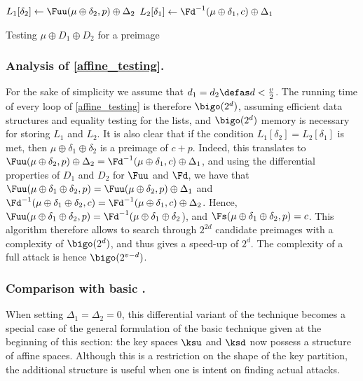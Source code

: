 \begin{algorithm}[ht]
\LinesNumbered
{}

{
	$L_1[\delta_2] \leftarrow \Fuu(\mu \oplus \delta_2, p) \oplus \Delta_2$
}
{
	$L_2[\delta_1] \leftarrow \Fd^{-1}(\mu \oplus \delta_1, c) \oplus \Delta_1$
}
{
{
}
}
\Return{$\bot$}
\caption{\label{affine_testing}Testing $\mu \oplus D_1 \oplus D_2$ for a preimage~\cite{DBLP:conf/crypto/KnellwolfK12}}

\end{algorithm}

\subsubsection{Analysis of \autoref{affine_testing}.}
For the sake of simplicity we assume that $d_1 = d_2 \defas d < \frac{v}{2}$.
The running time of every loop of \autoref{affine_testing} is therefore $\bigo(2^d)$, assuming efficient
data structures and equality testing for the lists,
and $\bigo(2^d)$ memory is necessary for storing $L_1$ and $L_2$. It is also
clear that if the condition $L_1[\delta_2] = L_2[\delta_1]$ is met, then $\mu \oplus \delta_1 \oplus \delta_2$
is a preimage of $c + p$. Indeed, this translates to $\Fuu(\mu \oplus \delta_2, p) \oplus \Delta_2
= \Fd^{-1}(\mu \oplus \delta_1, c) \oplus \Delta_1$, and using the differential properties
of $D_1$ and $D_2$ for $\Fuu$ and $\Fd$, we
have that $\Fuu(\mu \oplus \delta_1 \oplus \delta_2, p) = \Fuu(\mu \oplus \delta_2, p) \oplus \Delta_1$
and $\Fd^{-1}(\mu \oplus \delta_1 \oplus \delta_2, c) = \Fd^{-1}(\mu \oplus \delta_1, c) \oplus \Delta_2$.
Hence, $\Fuu(\mu \oplus \delta_1 \oplus \delta_2, p) = \Fd^{-1}(\mu \oplus \delta_1 \oplus \delta_2$), and
$\Fs(\mu \oplus \delta_1 \oplus \delta_2, p) = c$.
This algorithm therefore allows to search through $2^{2d}$ candidate preimages with a complexity
of $\bigo(2^d)$, and thus gives a speed-up of $2^d$. The complexity of a full attack is hence $\bigo(2^{v - d})$.

\subsubsection{Comparison with basic \mitm.}
When setting $\Delta_1 = \Delta_2 = 0$, this differential variant of the \mitm technique becomes a special case
of the general formulation of the basic technique given at the beginning of this section: the key spaces $\ksu$ and $\ksd$ now possess a structure
of affine spaces.
Although this is a restriction on the shape of the key partition, the additional structure is useful when one is intent on finding actual attacks.

